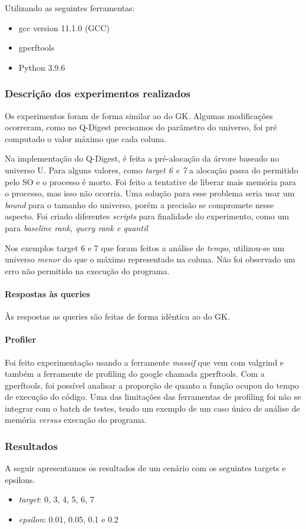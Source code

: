 \documentclass[11pt]{article}
\begin{document}
Utilizando as seguintes ferramentas:
\begin{itemize}
  \item gcc version 11.1.0 (GCC)
  \item gperftools
  \item Python 3.9.6
\end{itemize}

\subsubsection{Descrição dos experimentos realizados}
Os experimentos foram de forma similar ao do GK. Algumas modificações ocorreram, como no Q-Digest precisamos do parâmetro do universo, foi pré computado o valor máximo que cada coluna.

Na implementação do Q-Digest, é feita a pré-alocação da árvore baseado no universo U. Para alguns valores, como \textit{target 6 e 7} a alocação passa do permitido pelo SO e o processo é morto. Foi feito a tentative de liberar mais memória para o processo, mas isso não ocorria. Uma solução para esse problema seria usar um \textit{bound} para o tamanho do universo, porém a precisão se compromete nesse aspecto. Foi criado diferentes \textit{scripts} para finalidade do experimento, como um para \textit{baseline rank, query rank e quantil}


Nos exemplos target 6 e 7 que foram feitos a análise de \textit{tempo}, utilizou-se um universo \emph{menor} do que o máximo representado na coluna. Não foi observado um erro não permitido na execução do programa.
\paragraph{Respostas às queries}
Às respostas as queries são feitas de forma idêntica ao do GK.

\paragraph{Profiler}
Foi feito experimentação usando a ferramente \textit{massif} que vem com valgrind e também a ferramente de profiling do google chamada gperftools. Com a gperftools, foi possível analisar a proporção de quanto a função ocupou do tempo de execução do código. Uma das limitações das ferramentas de profiling foi não se integrar com o batch de testes, tendo um exemplo de um caso único de análise de memória \textit{versus} execução do programa.

\subsubsection{Resultados}
A seguir apresentamos os resultados de um cenário com os seguintes targets e epsilons.
\begin{itemize}
  \item \emph{target}: 0, 3, 4, 5, 6, 7
  \item \emph{epsilon}: 0.01, 0.05, 0.1 e 0.2
\end{itemize}
\end{document}
